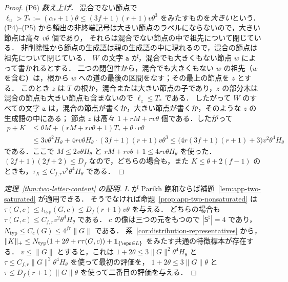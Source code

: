 \begin{proof}
(P6) \emph{数え上げ．}
混合でない節点で $\ell_u>T_*:=(\alpha_*+1)\theta\le(3f+1)(r+1)v\theta^3$ をみたすものを\emph{大きい}という．
(P4)--(P5) から頻出の非終端記号は大きい節点のラベルにならないので，大きい節点は高々 $v\theta$ 個であり，
それらは混合でない節点の中で祖先について閉じている．
非削除性から節点の生成語は親の生成語の中に現れるので，混合の節点は祖先について閉じている．
$W$ の文字 $\mathtt a$ が，混合でも大きくもない節点 $w$ によって書かれるとする．
二つの閉包性から，混合でも大きくもない $w$ の祖先（$w$ を含む）は，根から $w$ への道の最後の区間をなす；その最上の節点を $z$ とする．
このとき $z$ は $T$ の根か，混合または大きい節点の子であり，$z$ の部分木は混合の節点も大きい節点も含まないので $\ell_z\le T_*$ である．
したがって $W$ のすべての文字 $\mathtt a$ は，混合の節点が書くか，大きい節点が書くか，そのような $z$ の生成語の中にある；
節点 $z$ は高々 $1+rM+rv\theta$ 個である．したがって
\[
\begin{aligned}
 p+K&\le\theta M+(rM+rv\theta+1)T_*+\theta\cdot v\theta\\
 &\le3v\theta^2H_\theta+4rv\theta H_\theta\cdot(3f+1)(r+1)v\theta^3
 \le\bigl(4r(3f+1)(r+1)+3\bigr)v^2\theta^4H_\theta
\end{aligned}
\]
である．ここで $M\le2v\theta H_\theta$ と $rM+rv\theta+1\le4rv\theta H_\theta$ を使った．
$(2f+1)(2f+2)\le D_f$ なので，どちらの場合も，また $K\le\theta+2(f-1)$ のときも，$\tau_X\le C_{f,r}v^2\theta^4H_\theta$ である．
\end{proof}

\begin{proof}[定理~\ref{thm:two-letter-content} の証明]
$L$ が Parikh 飽和ならば補題~\ref{lem:app-two-saturated} が適用できる．
そうでなければ命題~\ref{prop:app-two-nonsaturated} は $\tau(G,c)\le t_{\mathrm{typ}}(G,c)\le D_f(r+1)v\theta$ を与える．
どちらの場合も $\tau(G,c)\le C_{f,r}v^2\theta^4H_\theta$ である．
$c$ の像は三つの元をもつので $|\mathsf S^\sharp|=4$ であり，$N_{\mathrm{typ}}\le C_c(G)\le4^{fr}\|G\|$ である．
系~\ref{cor:distribution-representatives} から，
$\|K\|_+\le N_{\mathrm{typ}}(1+2\theta+r\tau(G,c))+\mathbf 1_{\{\eps\in L\}}$ をみたす共通の特徴標本が存在する．
$v\le\|G\|$ とすると，これは $1+2\theta\le3\|G\|^2\theta^4H_\theta$ と $\tau\le C_{f,r}\|G\|^2\theta^4H_\theta$ を使って最初の評価を，
$1+2\theta\le3\|G\|\theta$ と $\tau\le D_f(r+1)\|G\|\theta$ を使って二番目の評価を与える．
\end{proof}
